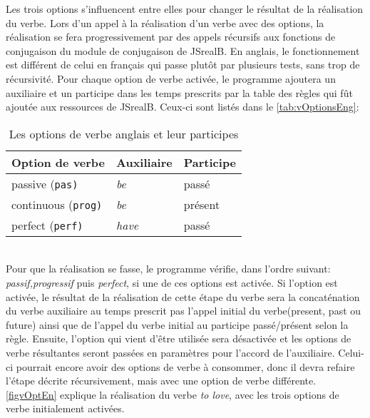 \documentclass[11pt]{article} %
\newcommand{\system}[1]{\textsf{#1}}
\newcommand{\JSB}{\system{JSrealB}}
\begin{document}
Les trois options s'influencent entre elles pour changer le
résultat de la réalisation du verbe. Lors d'un appel à la réalisation
d'un verbe avec des options, la réalisation se fera progressivement
par des appels récursifs aux fonctions de conjugaison du module de
conjugaison de \JSB{}. En anglais, le fonctionnement est différent
de celui en français qui passe plutôt par plusieurs tests, sans trop
de récursivité. Pour chaque option de verbe activée, le programme ajoutera
un auxiliaire et un participe dans les temps prescrits par la table
des règles qui fût ajoutée aux ressources de \JSB{}. Ceux-ci
sont listés dans le \autoref{tab:vOptionsEng}: 
\\
\begin{table}
\centering
\caption{Les options de verbe anglais et leur participes}
\begin{tabular}{|l|l|l|}
\hline 
Option de verbe & Auxiliaire & Participe\tabularnewline
\hline 
\hline 
passive (\texttt{pas)} & \emph{be} & passé\tabularnewline
\hline 
continuous (\texttt{prog)} & \emph{be} & présent\tabularnewline
\hline 
perfect (\texttt{perf)} & \emph{have} & passé\tabularnewline
\hline 
\end{tabular}
\label{tab:vOptionsEng}
\end{table}
\\
Pour que la réalisation se fasse, le programme vérifie, dans l'ordre
suivant: \emph{passif,progressif} puis \emph{perfect}, si une de ces options est
activée. Si l'option est activée, le résultat de la réalisation de
cette étape du verbe sera la concaténation du verbe auxiliaire au
temps prescrit pas l'appel initial du verbe(present, past ou future)
ainsi que de l'appel du verbe initial au participe passé/présent selon
la règle. Ensuite, l'option qui vient d'être utilisée sera désactivée et les options
de verbe résultantes seront passées en paramètres pour l'accord de
l'auxiliaire. Celui-ci pourrait encore avoir des options de verbe
à consommer, donc il devra refaire l'étape décrite récursivement,
mais avec une option de verbe différente. \autoref{figvOptEn} explique
 la réalisation du verbe \emph{to love}, avec les trois options
de verbe initialement activées.
\begin{figure}
\centering
\caption{}
\label{figvOptEn}
\end{figure}
\end{document}
